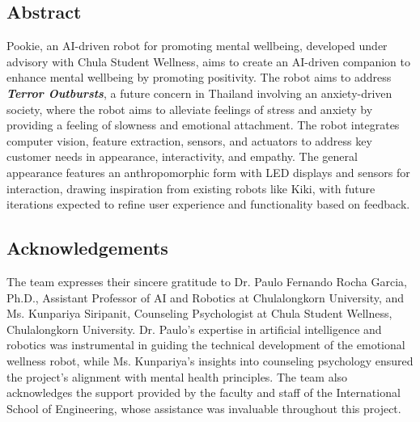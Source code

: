 \documentclass[a4paper,10pt]{article}
\begin{document}
\newpage
\begin{center}
    \item\section*{Abstract}
\end{center}
\large
Pookie, an AI-driven robot for promoting mental wellbeing, developed under advisory with
Chula Student Wellness, aims to create an AI-driven companion to enhance mental wellbeing by promoting positivity. The robot aims to address \textbf{\textit{Terror Outbursts}}, a future
concern in Thailand involving an anxiety-driven society, where the robot aims to alleviate
feelings of stress and anxiety by providing a feeling of slowness and emotional attachment.
The robot integrates computer vision, feature extraction, sensors, and actuators to address
key customer needs in appearance, interactivity, and empathy. The general appearance
features an anthropomorphic form with LED displays and sensors for interaction, drawing
inspiration from existing robots like Kiki, with future iterations expected to
refine user experience and functionality based on feedback.
\newpage
\begin{center}
    \item\section*{Acknowledgements}
\end{center}
The team expresses their sincere gratitude to Dr. Paulo Fernando Rocha Garcia, Ph.D., Assistant Professor of AI and Robotics at Chulalongkorn University, and Ms. Kunpariya Siripanit, Counseling Psychologist at Chula Student Wellness, Chulalongkorn University. Dr. Paulo’s expertise in artificial intelligence and robotics was instrumental in guiding the technical development of the emotional wellness robot, while Ms. Kunpariya’s insights into counseling psychology ensured the project’s alignment with mental health principles. The team also acknowledges the support provided by the faculty and staff of the International School of Engineering, whose assistance was invaluable throughout this project. 
\normalsize

\newpage
\tableofcontents

\newpage

\newpage    

\newpage

\newpage

\newpage

\newpage

\newpage

\newpage


\newpage
{}


\end{document}
